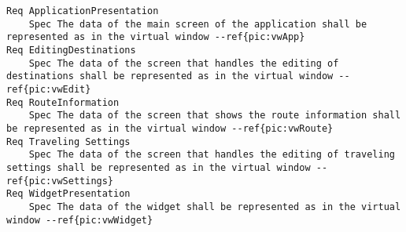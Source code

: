 

\begin{lstlisting}
Req ApplicationPresentation
	Spec The data of the main screen of the application shall be represented as in the virtual window --ref{pic:vwApp}
Req EditingDestinations
	Spec The data of the screen that handles the editing of destinations shall be represented as in the virtual window --ref{pic:vwEdit}
Req RouteInformation
	Spec The data of the screen that shows the route information shall be represented as in the virtual window --ref{pic:vwRoute}
Req Traveling Settings
	Spec The data of the screen that handles the editing of traveling settings shall be represented as in the virtual window --ref{pic:vwSettings}
Req WidgetPresentation
	Spec The data of the widget shall be represented as in the virtual window --ref{pic:vwWidget}

\end{lstlisting}
